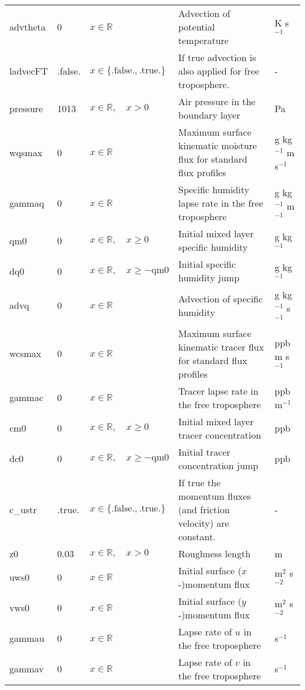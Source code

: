 \documentclass[twoside,11pt,fleqn,a4paper,english,openright]{report}
\begin{document}
\begin{center}
\begin{supertabular}{|l|p{1.6cm}|p{4cm}|p{5cm}|l|}
advtheta&	0				&	$x \in \mathbb{R}$								&	Advection of potential temperature	& K s$^{-1}$\\
ladvecFT& .false. &	$x\in\{\text{.false.},\text{.true.}\}$	& If true advection is also applied for free troposphere.	& -\\
pressure	&	1013	&	$x \in \mathbb{R}, \quad x > 0$	& Air pressure in the boundary layer	&	Pa\\
wqsmax	&	0			&	$x \in \mathbb{R}$								&	Maximum surface kinematic moisture flux for standard flux profiles	& g kg$^{-1}$ m s$^{-1}$\\
gammaq	&	0			&	$x \in \mathbb{R}$								& Specific humidity lapse rate in the free troposphere	&	g kg$^{-1}$ m$^{-1}$\\
qm0		& 0				&	$x \in \mathbb{R}, \quad x \geq 0$		& Initial mixed layer specific humidity	&	g kg$^{-1}$\\
dq0		&	0				&	$x \in \mathbb{R},\quad x \geq - \text{qm0}$	& Initial specific humidity jump	&	g kg$^{-1}$\\
advq	&	0				&	$x \in \mathbb{R}$								&	Advection of specific humidity	& g kg$^{-1}$ s$^{-1}$\\
wcsmax	&	0			&	$x \in \mathbb{R}$								&	Maximum surface kinematic tracer flux for standard flux profiles	& ppb m s$^{-1}$\\
gammac	&	0			&	$x \in \mathbb{R}$								& Tracer lapse rate in the free troposphere	&	ppb m$^{-1}$\\
cm0		& 0				&	$x \in \mathbb{R}, \quad x \geq 0$		& Initial mixed layer tracer concentration	&	ppb\\
dc0		&	0				&	$x \in \mathbb{R},\quad x \geq - \text{qm0}$	& Initial tracer concentration jump	&	ppb\\
c\_ustr	&	.true.	&	$x\in\{\text{.false.},\text{.true.}\}$	& If true the momentum fluxes (and friction velocity) are constant.	& -\\
z0		&	0.03		&	$x \in \mathbb{R}, \quad x > 0$		& Roughness length	&	m\\
uws0	&	0				&	$x \in \mathbb{R}$								&	Initial surface ($x$-)momentum flux	& m$^{2}$ s$^{-2}$\\
vws0	&	0				&	$x \in \mathbb{R}$								&	Initial surface ($y$-)momentum flux	& m$^{2}$ s$^{-2}$\\
gammau	&	0			& $x \in \mathbb{R}$								&	Lapse rate of $u$ in the free troposphere	& s$^{-1}$\\
gammav	&	0			& $x \in \mathbb{R}$								&	Lapse rate of $v$ in the free troposphere	& s$^{-1}$\\

\end{supertabular}
\end{center}
\end{document}
